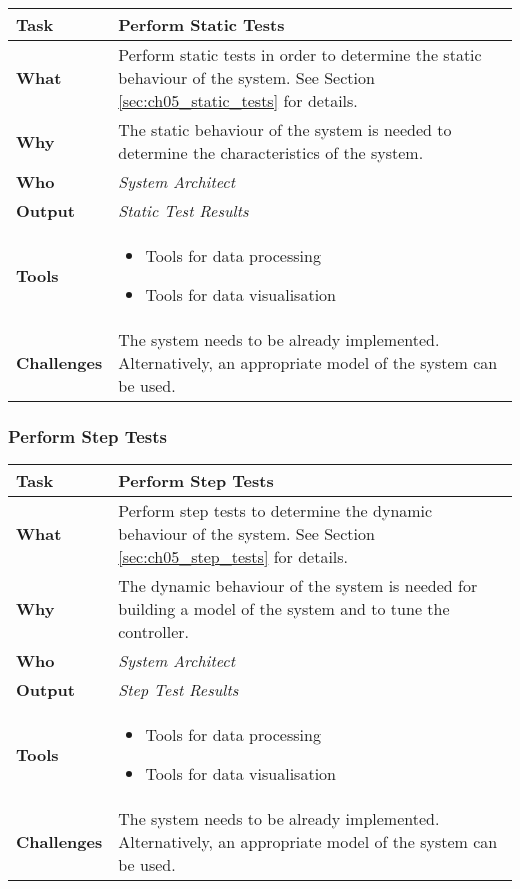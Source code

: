 \begin{tabularx}{\textwidth}{@{} l X @{}}
	\caption{Perform Static Tests} \label{table:ch6_Task_Static_Tests}\\
	\toprule 
	\bfseries Task & Perform Static Tests\\
	\midrule 
	\bfseries What & Perform static tests in order to determine the static behaviour of the system. See Section \ref{sec:ch05_static_tests} for details.\\
	\midrule 
	\bfseries Why & The static behaviour of the system is needed to determine the characteristics of the system.\\
	\midrule 
	\bfseries Who & \emph{System Architect}\\
	\midrule 
	\bfseries Output & \emph{Static Test Results}\\
	\midrule 
	\bfseries Tools & 
	\begin{itemize}
		\item Tools for data processing
		\item Tools for data visualisation
	\end{itemize}\\
	\midrule
	\bfseries Challenges & The system needs to be already implemented. Alternatively, an appropriate model of the system can be used.
	\\
	\bottomrule
\end{tabularx}

\subsubsection{Perform Step Tests}

\begin{tabularx}{\textwidth}{@{} l X @{}}
	\caption{Perform Step Tests} \label{table:ch6_Task_Step_Tests}\\
	\toprule 
	\bfseries Task & Perform Step Tests\\
	\midrule 
	\bfseries What & Perform step tests to determine the dynamic behaviour of the system. See Section \ref{sec:ch05_step_tests} for details.\\
	\midrule 
	\bfseries Why & The dynamic behaviour of the system is needed for building a model of the system and to tune the controller.\\
	\midrule 
	\bfseries Who & \emph{System Architect}\\
	\midrule 
	\bfseries Output & \emph{Step Test Results}\\
	\midrule 
	\bfseries Tools & 
	\begin{itemize}
		\item Tools for data processing
		\item Tools for data visualisation
	\end{itemize}\\
	\midrule
	\bfseries Challenges & The system needs to be already implemented. Alternatively, an appropriate model of the system can be used.
	\\
	\bottomrule 
\end{tabularx}



